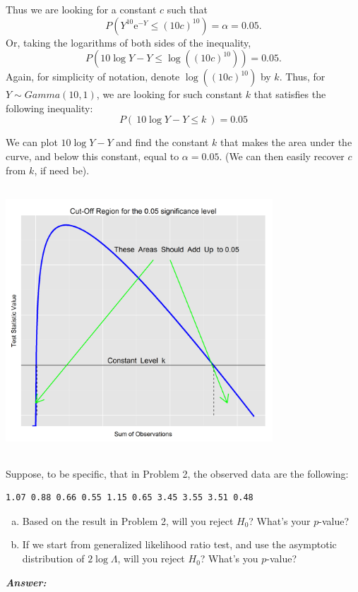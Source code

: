 \documentclass[12pt]{article}
\newenvironment{question}[2][Question]{\begin{trivlist}
\item[\hskip \labelsep {\bfseries #1}\hskip \labelsep {\bfseries #2.}]}{\end{trivlist}}
\begin{document}
\begin{enumerate}[(a)]
Thus we are looking for a constant $c$ such that 
$$
P \left( Y^{10} \mathrm{e}^{-Y} \leq (10 c)^{10} \right)  = \alpha = 0.05.
$$
Or, taking the logarithms of both sides of the inequality,
$$
P \left(  10 \log Y - Y \leq \log \left( (10 c)^{10} \right) \right) = 0.05.
$$
Again, for simplicity of notation, denote $\log( (10 c)^{10}) $ by $k$. Thus, for $Y \sim Gamma(10,1)$, we are looking for such constant $k$ that satisfies the following inequality:
$$
\boxed{P \left( \  10 \log Y - Y \leq k \  \right) = 0.05}
$$

We can plot $ 10 \log Y - Y $ and find the constant $k$ that makes the area under the curve, and below this constant, equal to $\alpha = 0.05$. (We can then easily recover $c$ from $k$, if need be).

\begin{center}
\includegraphics[width=10cm, height=10cm]{alpha_cut_off}
\end{center} 
\end{enumerate}


\bigskip
\bigskip
 \begin{question}{6.3}Suppose, to be specific, that in Problem 2, the observed data are the following:
\begin{verbatim}
1.07 0.88 0.66 0.55 1.15 0.65 3.45 3.55 3.51 0.48
\end{verbatim}

\begin{enumerate}[(a)]
\item Based on the result in Problem 2, will you reject $H_0$? What's your $p$-value?
\item If we start from generalized likelihood ratio test, and use the asymptotic distribution of $2 \log \Lambda$, will you reject $H_0$? What's you $p$-value?
\end{enumerate}

\end{question} 


  \textbf{\color{TealBlue}\emph{Answer:} } 
 
\end{document}
